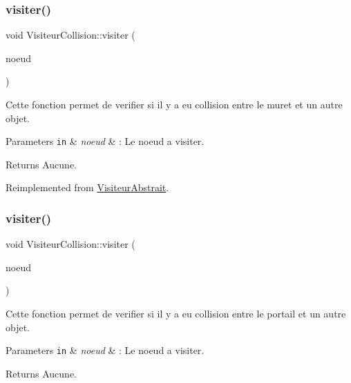 \subsubsection{\texorpdfstring{visiter()}{visiter()}\hspace{0.1cm}{\footnotesize\ttfamily [4/8]}}
{\footnotesize\ttfamily void Visiteur\+Collision\+::visiter (\begin{DoxyParamCaption}\item[{\hyperlink{class_noeud_muret}{Noeud\+Muret} $\ast$}]{noeud }\end{DoxyParamCaption})\hspace{0.3cm}{\ttfamily [virtual]}}

Cette fonction permet de verifier si il y a eu collision entre le muret et un autre objet.


\begin{DoxyParams}[1]{Parameters}
\mbox{\tt in}  & {\em noeud} & \+: Le noeud a visiter.\\
\hline
\end{DoxyParams}
\begin{DoxyReturn}{Returns}
Aucune. 
\end{DoxyReturn}


Reimplemented from \hyperlink{class_visiteur_abstrait}{Visiteur\+Abstrait}.

\hypertarget{class_visiteur_collision_a0dddecba0e89904757fca3d9081d678f}{}\label{class_visiteur_collision_a0dddecba0e89904757fca3d9081d678f} 
\subsubsection{\texorpdfstring{visiter()}{visiter()}\hspace{0.1cm}{\footnotesize\ttfamily [5/8]}}
{\footnotesize\ttfamily void Visiteur\+Collision\+::visiter (\begin{DoxyParamCaption}\item[{\hyperlink{class_noeud_portail}{Noeud\+Portail} $\ast$}]{noeud }\end{DoxyParamCaption})\hspace{0.3cm}{\ttfamily [virtual]}}

Cette fonction permet de verifier si il y a eu collision entre le portail et un autre objet.


\begin{DoxyParams}[1]{Parameters}
\mbox{\tt in}  & {\em noeud} & \+: Le noeud a visiter.\\
\hline
\end{DoxyParams}
\begin{DoxyReturn}{Returns}
Aucune. 
\end{DoxyReturn}


